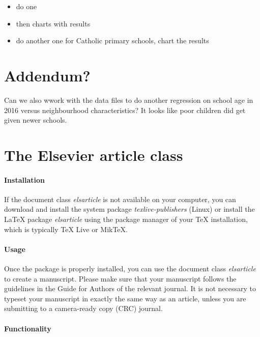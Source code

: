 \documentclass[]{elsarticle} %
\begin{document}
\begin{itemize}
\item
  do one
\item
  then charts with results
\item
  do another one for Catholic primary schools, chart the results
\end{itemize}

\hypertarget{addendum}{%
\section{Addendum?}\label{addendum}}

Can we also wwork with the data files to do another regression on school
age in 2016 versus neighbourhood characteristics? It looks like poor
children did get given newer schools.

\hypertarget{the-elsevier-article-class}{%
\section{The Elsevier article class}\label{the-elsevier-article-class}}

\hypertarget{installation}{%
\paragraph{Installation}\label{installation}}

If the document class \emph{elsarticle} is not available on your
computer, you can download and install the system package
\emph{texlive-publishers} (Linux) or install the LaTeX package
\emph{elsarticle} using the package manager of your TeX installation,
which is typically TeX Live or MikTeX.

\hypertarget{usage}{%
\paragraph{Usage}\label{usage}}

Once the package is properly installed, you can use the document class
\emph{elsarticle} to create a manuscript. Please make sure that your
manuscript follows the guidelines in the Guide for Authors of the
relevant journal. It is not necessary to typeset your manuscript in
exactly the same way as an article, unless you are submitting to a
camera-ready copy (CRC) journal.

\hypertarget{functionality}{%
\paragraph{Functionality}\label{functionality}}
\end{document}
